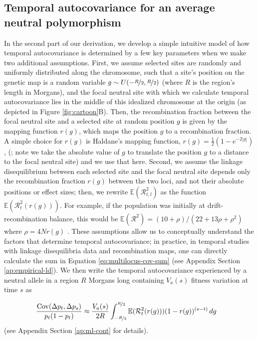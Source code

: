 \documentclass[11pt]{article}
\newcommand{\E}{\mathbb{E}}
\DeclareMathOperator{\cov}{Cov}
\begin{document}
\subsection{Temporal autocovariance for an average neutral polymorphism}
\label{sec:temp-autocov-aveneut}

In the second part of our derivation, we develop a simple intuitive model of
how temporal autocovariance is determined by a few key parameters when we make
two additional assumptions. First, we assume selected sites are randomly and
uniformly distributed along the chromosome, such that a site's position on the
genetic map is a random variable $g \sim U(-\nicefrac{R}{2}, \nicefrac{R}{2})$
(where $R$ is the region's length in Morgans), and the focal neutral site with
which we calculate temporal autocovariance lies in the middle of this idealized
chromosome at the origin (as depicted in Figure \ref{fig:cartoon}B). Then, the
recombination fraction between the focal neutral site and a selected site at
random position $g$ is given by the mapping function $r(g)$, which maps the
position $g$ to a recombination fraction. A simple choice for $r(g)$ is
Haldane's mapping function, $r(g) = \frac{1}{2} (1 - e^{-2|g|})$,
(\cite{Haldane1919-qp}; note we take the absolute value of $g$ to translate the
position $g$ to a distance to the focal neutral site) and we use that here.
Second, we assume the linkage disequilibrium between each selected site and the
focal neutral site depends only the recombination fraction $r(g)$ between the
two loci, and not their absolute positions or effect sizes; then, we rewrite
$\E(\mathcal{R}^2_{t,l})$ as the function $\E(\mathcal{R}^2_t(r(g)))$. For
example, if the population was initially at drift-recombination balance, this
would be $\E(\mathcal{R}^2) = (10 + \rho)/(22 + 13 \rho + \rho^2)$ where $\rho
= 4Nr(g)$ \parencite{Ohta1969-ae,Hill1968-ue}. These assumptions allow us
  to conceptually understand the factors that determine temporal
autocovariance; in practice, in temporal studies with linkage disequilibria
data and recombination maps, one can directly calculate the sum in Equation
\eqref{eq:multilocus-cov-sum} (see Appendix Section \ref{ap:empirical-ld}). We
then write the temporal autocovariance experienced by a neutral allele in a
region $R$ Morgans long containing $V_a(s)$ fitness variation at time $s$ as

\begin{align}
  \frac{\cov(\Delta p_t, \Delta p_s)}{p_t(1-p_t) } &\approx \frac{V_a(s)}{2 R} \int_{-\nicefrac{R}{2}}^{\nicefrac{R}{2}} \E(\mathcal{R}_t^2(r(g))) (1-r(g))^{(s-t)} \,dg
  \label{eq:ave-neut-autocov}
\end{align}
%
(see Appendix Section \ref{ap:ml-cont} for details).
\end{document}
